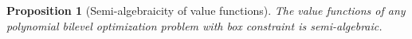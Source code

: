 \documentclass{article}
\newcommand*{\cC}{\mathcal{C}}
\newcommand*{\cP}{\mathcal{P}}
\newcommand*{\cY}{\mathcal{Y}}
\newcommand*{\RR}{\mathbb{R}}
\newcommand{\firstvar}{x}
\newcommand{\secondvar}{y}
\newcommand{\ff}{\varphi}
\newcommand{\SA}{\mathcal{SA}}
\newcommand{\formule}{\texttt{mode}}
\newcommand{\property}{\texttt{boxtype}}
\newcommand{\unbounded}{\text{unbound}}
\newcommand{\bounded}{\text{bounded}}
\newcommand{\optim}{\text{optim}}
\newcommand{\pessim}{\text{pessim}}
\newcommand{\valoptim}{\varphi_o}
\newcommand{\valpessim}{\varphi_p}
\newcommand{\TL}[1]{\textcolor{red}{#1}}
\theoremstyle{plain}
\newtheorem{lemma}[theorem]{Lemma}
\newtheorem{proposition}[theorem]{Proposition}
\theoremstyle{definition}
\begin{document}
\begin{proposition}[Semi-algebraicity of value functions]
    \label{cor:upper-bound-nonconvex-class}
    The value functions of any polynomial bilevel optimization problem with box constraint is semi-algebraic.%
\end{proposition}
\end{document}

